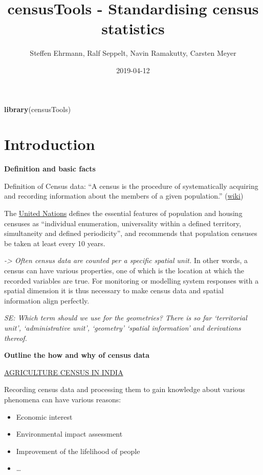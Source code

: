 \documentclass[12pt,]{article}
\title{censusTools - Standardising census statistics}
\author{Steffen Ehrmann, Ralf Seppelt, Navin Ramakutty, Carsten Meyer}
\date{2019-04-12}
\newenvironment{Shaded}{}{}
\newcommand{\KeywordTok}[1]{\textcolor[rgb]{0.00,0.44,0.13}{\textbf{#1}}}
\newcommand{\NormalTok}[1]{#1}
\providecommand{\tightlist}{%
  \setlength{\itemsep}{0pt}\setlength{\parskip}{0pt}}
\begin{document}
\maketitle

\begin{Shaded}
\begin{Highlighting}[]
\KeywordTok{library}\NormalTok{(censusTools)}
\end{Highlighting}
\end{Shaded}

\hypertarget{introduction}{%
\section{Introduction}\label{introduction}}

\textbf{Definition and basic facts}

Definition of Census data: ``A census is the procedure of systematically acquiring and recording information about the members of a given population.'' (\href{https://en.wikipedia.org/wiki/Census}{wiki})

The \href{https://unstats.un.org/unsd/demographic/sources/census/docs/P\&R_Rev2.pdf}{United Nations} defines the essential features of population and housing censuses as ``individual enumeration, universality within a defined territory, simultaneity and defined periodicity'', and recommends that population censuses be taken at least every 10 years.

\emph{-\textgreater{} Often census data are counted per a specific spatial unit.} In other words, a census can have various properties, one of which is the location at which the recorded variables are true. For monitoring or modelling system responses with a spatial dimension it is thus necessary to make census data and spatial information align perfectly.

\emph{SE: Which term should we use for the geometries? There is so far `territorial unit', `administrative unit', `geometry' `spatial information' and derivations thereof.}

\textbf{Outline the how and why of census data}

\href{http://iasri.res.in/ebook/TEFCPI_sampling/AGRICULTURE\%20CENSUS\%20IN\%20INDIA.pdf}{AGRICULTURE CENSUS IN INDIA}

Recording census data and processing them to gain knowledge about various phenomena can have various reasons:

\begin{itemize}
\tightlist
\item
  Economic interest
\item
  Environmental impact assessment
\item
  Improvement of the lifelihood of people
\item
  \ldots{}
\end{itemize}
\end{document}
